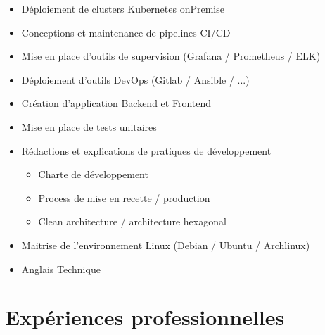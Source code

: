\documentclass[letterpaper]{twentysecondcv} %
\begin{document}
\begin{itemize}
  \item Déploiement de clusters Kubernetes onPremise
  \item Conceptions et maintenance de pipelines CI/CD
  \item Mise en place d'outils de supervision (Grafana / Prometheus / ELK)
  \item Déploiement d'outils DevOps (Gitlab / Ansible / ...)
  \item Création d'application Backend et Frontend
  \item Mise en place de tests unitaires
  \item Rédactions et explications de pratiques de développement
  \begin{itemize}
    \item Charte de développement
    \item Process de mise en recette / production
    \item Clean architecture / architecture hexagonal
  \end{itemize}
  \item Maitrise de l'environnement Linux (Debian / Ubuntu / Archlinux)
  \item Anglais Technique
\end{itemize}

\vspace*{0.8cm}

\section{Expériences professionnelles}

\begin{twenty} %
\end{twenty}
\end{document}
